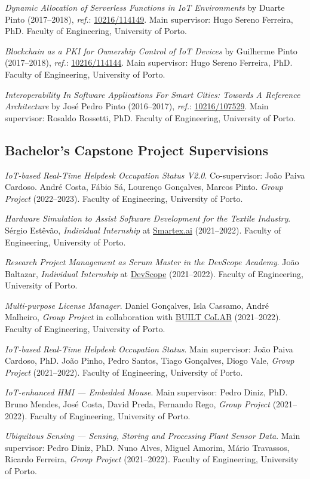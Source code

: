 \documentclass[10pt, a4paper]{article}
\newcommand{\FEUP}{Faculty of Engineering, University of Porto}
\begin{document}
\begin{etaremune}
	\item \textit{Dynamic Allocation of Serverless Functions in IoT Environments} by Duarte Pinto (2017--2018), \textit{ref.}: \href{http://hdl.handle.net/10216/114149}{10216/114149}. Main supervisor: Hugo Sereno Ferreira, PhD. \FEUP.
	
	\item \textit{Blockchain as a PKI for Ownership Control of IoT Devices} by Guilherme Pinto (2017--2018), \textit{ref.}: \href{http://hdl.handle.net/10216/114144}{10216/114144}. Main supervisor: Hugo Sereno Ferreira, PhD. \FEUP.
	
	\item \textit{Interoperability In Software Applications For Smart Cities: Towards A Reference Architecture} by José Pedro Pinto (2016--2017), \textit{ref.}:  \href{http://hdl.handle.net/10216/107529}{10216/107529}. Main supervisor: Rosaldo Rossetti, PhD. \FEUP.
\end{etaremune}

\subsection*{Bachelor's Capstone Project Supervisions}

\begin{etaremune}
	\renewcommand\labelenumi{\footnotesize\theenumi .}
 \item \textit{IoT-based Real-Time Helpdesk Occupation Status V2.0}. Co-supervisor: João Paiva Cardoso. André Costa, Fábio Sá, Lourenço Gonçalves, Marcos Pinto. \textit{Group Project} (2022--2023). \FEUP.
	\item \textit{Hardware Simulation to Assist Software Development for the Textile Industry}. Sérgio Estêvão, \textit{Individual Internship} at \href{https://www.smartex.ai/}{Smartex.ai} (2021--2022). \FEUP. 
	\item \textit{Research Project Management as Scrum Master in the DevScope Academy}. João Baltazar, \textit{Individual Internship} at \href{https://www.devscope.net/}{DevScope} (2021--2022). \FEUP. 
	
	\item \textit{Multi-purpose License Manager}. Daniel Gonçalves, Isla Cassamo, André Malheiro, \textit{Group Project} in collaboration with \href{https://www.builtcolab.pt/}{BUILT CoLAB} (2021--2022). \FEUP.
	
	\item \textit{IoT-based Real-Time Helpdesk Occupation Status}. Main supervisor: João Paiva Cardoso, PhD. João Pinho, Pedro Santos, Tiago Gonçalves, Diogo Vale, \textit{Group Project} (2021--2022). \FEUP.
	
	\item \textit{IoT-enhanced HMI --- Embedded Mouse}. Main supervisor: Pedro Diniz, PhD. Bruno Mendes, José Costa, David Preda, Fernando Rego, \textit{Group Project} (2021--2022). \FEUP.
	
	\item \textit{Ubiquitous Sensing --- Sensing, Storing and Processing Plant Sensor Data}. Main supervisor: Pedro Diniz, PhD. Nuno Alves, Miguel Amorim, Mário Travassos, Ricardo Ferreira, \textit{Group Project} (2021--2022). \FEUP.
\end{etaremune}
\end{document}
